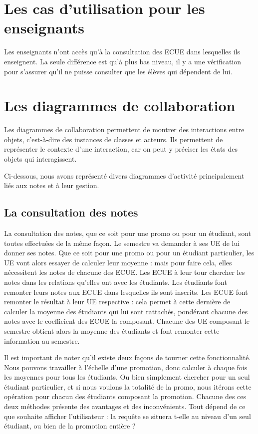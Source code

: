 \documentclass[letter, 11pt] {article}
\begin{document}
\section{Les cas d'utilisation pour les enseignants}

Les enseignants n'ont accès qu'à la consultation des ECUE dans lesquelles ils enseignent.
La seule différence est qu'à plus bas niveau, il y a une vérification pour s'assurer qu'il ne puisse consulter que les élèves qui dépendent de lui.
	
	\section{Les diagrammes de collaboration}
	
		Les diagrammes de collaboration permettent de montrer des interactions entre objets, c'est-à-dire des instances de classes et acteurs. Ils permettent de représenter le contexte d'une interaction, car on peut y préciser les états des objets qui interagissent.
		
		Ci-dessous, nous avons représenté divers diagrammes d'activité principalement liés aux notes et à leur gestion. 
		
		\subsection{La consultation des notes}
		
		La consultation des notes, que ce soit pour une promo ou pour un étudiant, sont toutes effectuées de la même façon.
		Le semestre va demander à ses UE de lui donner ses notes. Que ce soit pour une promo ou pour un étudiant particulier, les UE vont alors essayer de calculer leur moyenne : mais pour faire cela, elles nécessitent les notes de chacune des ECUE. Les ECUE à leur tour chercher les notes dans les relations qu’elles ont avec les étudiants. Les étudiants font remonter leurs notes aux ECUE dans lesquelles ils sont inscrits. Les ECUE font remonter le résultat à leur UE respective : cela permet à cette dernière de calculer la moyenne des étudiants qui lui sont rattachés, pondérant chacune des notes avec le coefficient des ECUE la composant. Chacune des UE composant le semestre obtient alors la moyenne des étudiants et font remonter cette information au semestre.
		
		Il est important de noter qu’il existe deux façons de tourner cette fonctionnalité. Nous pouvons travailler à l’échelle d’une promotion, donc calculer à chaque fois les moyennes pour tous les étudiants. Ou bien simplement chercher pour un seul étudiant particulier, et si nous voulons la totalité de la promo, nous itérons cette opération pour chacun des étudiants composant la promotion. Chacune des ces deux méthodes présente des avantages et des inconvénients. Tout dépend de ce que souhaite afficher l’utilisateur : la requête se situera t-elle au niveau d'un seul étudiant, ou bien de la promotion entière ?
				
\end{document}
